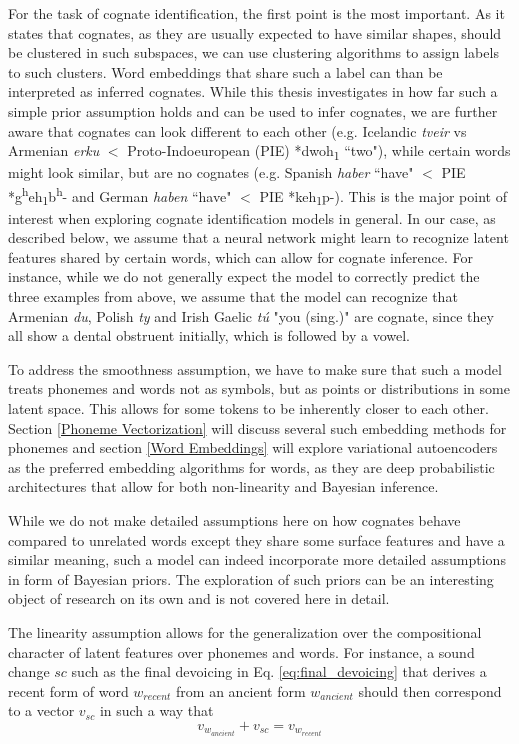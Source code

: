 \documentclass[6pt]{article}
\begin{document}
For the task of cognate identification, the first point is the most important. As it states that cognates, as they are usually expected to have similar shapes, should be clustered in such subspaces, we can use clustering algorithms to assign labels to such clusters. Word embeddings that share such a label can than be interpreted as inferred cognates. While this thesis investigates in how far such a simple prior assumption holds and can be used to infer cognates, we are further aware that cognates can look different to each other (e.g. Icelandic \textit{tveir} vs Armenian \textit{erku} $<$ Proto-Indoeuropean (PIE) *dwoh\textsubscript{1} ``two"), while certain words might look similar, but are no cognates (e.g. Spanish \textit{haber} ``have" $<$ PIE *g\textsuperscript{h}eh\textsubscript{1}b\textsuperscript{h}- and German \textit{haben} ``have" $<$ PIE *keh\textsubscript{1}p-). This is the major point of interest when exploring cognate identification models in general. In our case, as described below, we assume that a neural network might learn to recognize latent features shared by certain words, which can allow for cognate inference. For instance, while we do not generally expect the model to correctly predict the three examples from above, we assume that the model can recognize that Armenian \textit{du}, Polish \textit{ty} and Irish Gaelic \textit{tú} "you (sing.)" are cognate, since they all show a dental obstruent initially, which is followed by a vowel. 

To address the smoothness assumption, we have to make sure that such a model treats phonemes and words not as symbols, but as points or distributions in some latent space. This allows for some tokens to be inherently closer to each other. Section \ref{Phoneme Vectorization} will discuss several such embedding methods for phonemes and section \ref{Word Embeddings} will explore variational autoencoders \citep{kingma2013auto} as the preferred embedding algorithms for words, as they are deep probabilistic architectures that allow for both non-linearity and Bayesian inference. 

While we do not make detailed assumptions here on how cognates behave compared to unrelated words except they share some surface features and have a similar meaning, such a model can indeed incorporate more detailed assumptions in form of Bayesian priors. The exploration of such priors can be an interesting object of research on its own and is not covered here in detail.

The linearity assumption allows for the generalization over the compositional character of latent features over phonemes and words. For instance, a sound change $sc$ such as the final devoicing in Eq. \ref{eq:final_devoicing} that derives a recent form of word $w_{recent}$ from an ancient form  $w_{ancient}$ should then correspond to a vector $v_{sc}$ in such a way that 
\begin{equation}
\label{eq:sound_change_linear_dependency}
v_{w_{ancient}}+v_{sc} = v_{w_{recent}}
\end{equation}
\end{document}
